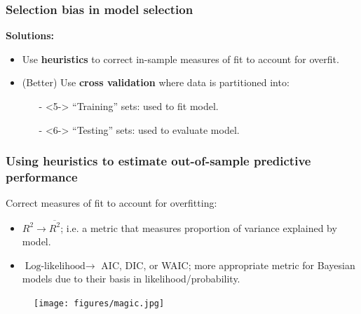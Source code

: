 \documentclass[handout]{beamer}
\begin{document}
\begin{frame}
	\frametitle{Selection bias in model selection}
	 \textbf{Solutions:}
	
	\begin{itemize}
		\item<3-> Use \textbf{heuristics} to correct in-sample measures of fit to account for overfit.
		\item<4-> (Better)  Use \textbf{cross validation} where data is partitioned into:
		\begin{itemize}
			\item[-]<5-> ``Training'' sets: used to fit model.
			\item[-]<6-> ``Testing'' sets: used to  evaluate model.
		\end{itemize}
	\end{itemize}
	
\end{frame}

\begin{frame}
	\frametitle{Using heuristics to estimate out-of-sample predictive performance}
	
	 Correct measures of fit to account for overfitting:
	\begin{itemize}
		\item<2-> $R^2\rightarrow \overline{R^2}$; i.e. a metric that measures proportion of variance explained by model.
		\item<3-> $\text{Log-likelihood}\rightarrow$ AIC, DIC, or WAIC; more appropriate metric for Bayesian models due to their basis in likelihood/probability.
	\end{itemize}
	
		\begin{figure}[ht]
			\centerline{\texttt{[image: figures/magic.jpg]}}
		\end{figure}
	
\end{frame}
\end{document}
